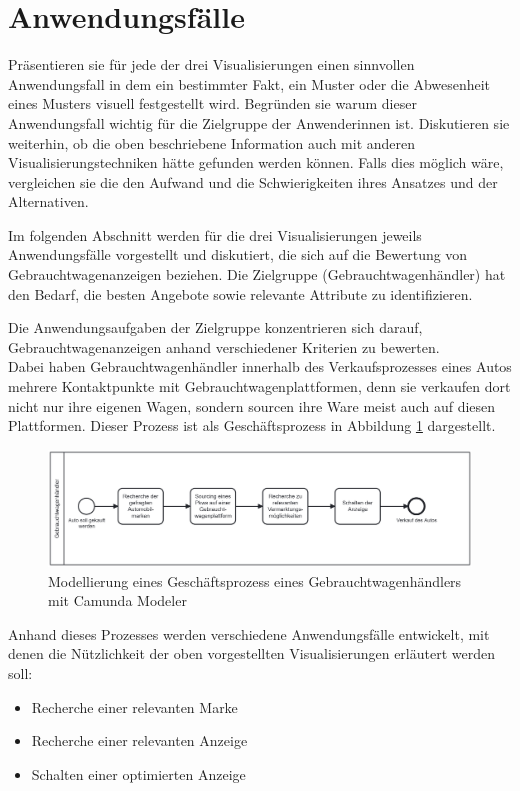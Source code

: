 \section{Anwendungsfälle}
Präsentieren sie für jede der drei Visualisierungen einen sinnvollen Anwendungsfall in dem ein bestimmter Fakt, ein Muster oder die Abwesenheit eines Musters visuell festgestellt wird. Begründen sie warum dieser Anwendungsfall wichtig für die Zielgruppe der Anwenderinnen ist. Diskutieren sie weiterhin, ob die oben beschriebene Information auch mit anderen Visualisierungstechniken hätte gefunden werden können. Falls dies möglich wäre, vergleichen sie die den Aufwand und die Schwierigkeiten ihres Ansatzes und der Alternativen. 


Im folgenden Abschnitt werden für die drei Visualisierungen jeweils Anwendungsfälle vorgestellt und diskutiert, die sich auf die Bewertung von Gebrauchtwagenanzeigen beziehen. Die Zielgruppe (Gebrauchtwagenhändler) hat den Bedarf, die besten Angebote sowie relevante Attribute zu identifizieren.

Die Anwendungsaufgaben der Zielgruppe konzentrieren sich darauf, Gebrauchtwagenanzeigen anhand verschiedener Kriterien zu bewerten. \\
Dabei haben Gebrauchtwagenhändler innerhalb des Verkaufsprozesses eines Autos mehrere Kontaktpunkte mit Gebrauchtwagenplattformen, denn sie verkaufen dort nicht nur ihre eigenen Wagen, sondern sourcen ihre Ware meist auch auf diesen Plattformen. Dieser Prozess ist als Geschäftsprozess in Abbildung \ref{fig:business-process} dargestellt. \\

\begin{figure}[H]
    \centering
    \includegraphics[width=\textwidth]{img/verkaufsprozess.png}
    \caption{Modellierung eines Geschäftsprozess eines Gebrauchtwagenhändlers mit Camunda Modeler}
    \label{fig:business-process}
\end{figure}
Anhand dieses Prozesses werden verschiedene Anwendungsfälle entwickelt, mit denen die Nützlichkeit der oben vorgestellten Visualisierungen erläutert werden soll: \\
\begin{itemize}
    \item Recherche einer relevanten Marke
    \item Recherche einer relevanten Anzeige
    \item Schalten einer optimierten Anzeige
\end{itemize}
